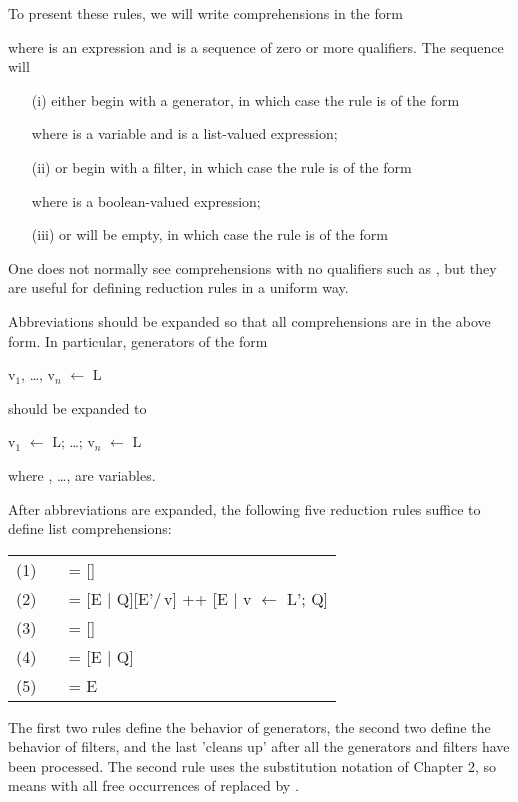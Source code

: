 To present these rules, we will write comprehensions in the form
\begin{mlcoded}
[E | Q]
\end{mlcoded}
where  is an expression and  is a sequence of zero or more qualifiers. The
sequence  will
\begin{enumerate}
    \item[(i)] either begin with a generator, in which case the rule is of the form
\begin{mlcoded}
    [E | v $\leftarrow$ L; Q']
\end{mlcoded}
    where  is a variable and  is a list-valued expression;
    \item[(ii)] or begin with a filter, in which case the rule is of the form
\begin{mlcoded}
    [E | B; Q']
\end{mlcoded}
    where  is a boolean-valued expression;
    \item[(iii)] or will be empty, in which case the rule is of the form
\begin{mlcoded}
    [E | \;]
\end{mlcoded}
\end{enumerate}
One does not normally see comprehensions with no qualifiers such as \ml{[E | ]},
but they are useful for defining reduction rules in a uniform way.

Abbreviations should be expanded so that all comprehensions are in the
above form. In particular, generators of the form
\begin{mlcoded}
    v$_1$, \ldots, v$_n$ $\leftarrow$ L
\end{mlcoded}
should be expanded to
\begin{mlcoded}
    v$_1$ $\leftarrow$ L; \ldots; v$_n$ $\leftarrow$ L
\end{mlcoded}
where , \ldots,  are variables.

After abbreviations are expanded, the following five reduction rules suffice
to define list comprehensions:
\begin{mlcoded}
    \begin{tabular}{lll}
    (1) &\quad{[E | v $\leftarrow$ {[\;]}; Q]}  &= [\;] \\
    (2) &\quad{[E | v $\leftarrow$ E':L'; Q]}  &= [E | Q][E'/\,v] ++ [E | v $\leftarrow$ L'; Q] \\
    (3) &\quad{[E | False; Q]}  &= [\;] \\
    (4) &\quad{[E | True; Q]}  &= [E | Q] \\
    (5) &\quad{[E |\; ]}  &= E
    \end{tabular}
\end{mlcoded}
The first two rules define the behavior of generators, the second two define
the behavior of filters, and the last 'cleans up' after all the generators and
filters have been processed. The second rule uses the substitution notation of
Chapter 2, so \ml{[E | Q]\,[E'/\,v]} means \ml{[E | Q]} with all free occurrences of 
replaced by .

